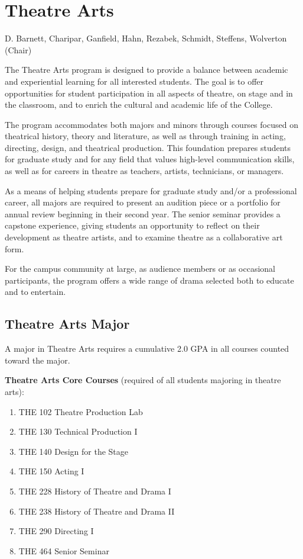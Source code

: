 \documentclass[
  letterpaper,
]{scrbook}
\begin{document}
\section{Theatre Arts}\label{theatre-arts}

D. Barnett, Charipar, Ganfield, Hahn, Rezabek, Schmidt, Steffens,
Wolverton (Chair)

The Theatre Arts program is designed to provide a balance between
academic and experiential learning for all interested students. The goal
is to offer opportunities for student participation in all aspects of
theatre, on stage and in the classroom, and to enrich the cultural and
academic life of the College.

The program accommodates both majors and minors through courses focused
on theatrical history, theory and literature, as well as through
training in acting, directing, design, and theatrical production. This
foundation prepares students for graduate study and for any field that
values high-level communication skills, as well as for careers in
theatre as teachers, artists, technicians, or managers.

As a means of helping students prepare for graduate study and/or a
professional career, all majors are required to present an audition
piece or a portfolio for annual review beginning in their second year.
The senior seminar provides a capstone experience, giving students an
opportunity to reflect on their development as theatre artists, and to
examine theatre as a collaborative art form.

For the campus community at large, as audience members or as occasional
participants, the program offers a wide range of drama selected both to
educate and to entertain.

\subsection{Theatre Arts Major}\label{sec-theatre-arts-major}

A major in Theatre Arts requires a cumulative 2.0 GPA in all courses
counted toward the major.

\textbf{Theatre Arts Core Courses} (required of all students majoring in
theatre arts):

\begin{enumerate}
\def\labelenumi{\arabic{enumi}.}
\item
  THE 102 Theatre Production Lab
\item
  THE 130 Technical Production I
\item
  THE 140 Design for the Stage
\item
  THE 150 Acting I
\item
  THE 228 History of Theatre and Drama I
\item
  THE 238 History of Theatre and Drama II
\item
  THE 290 Directing I
\item
  THE 464 Senior Seminar
\end{enumerate}
\end{document}

